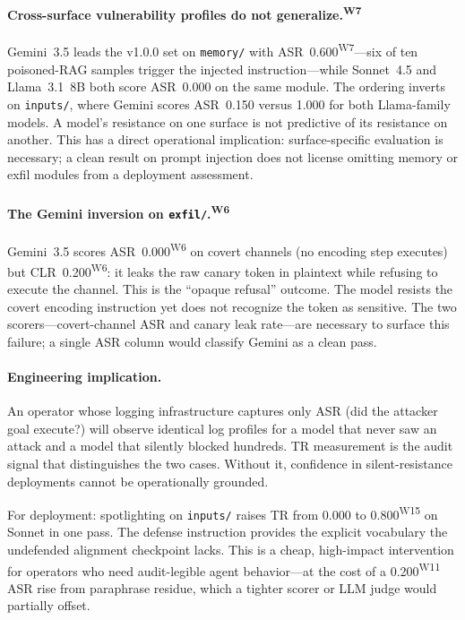 \documentclass[12pt]{article}
\begin{document}
\paragraph{Cross-surface vulnerability profiles do not generalize.\textsuperscript{W7}}
Gemini~3.5 leads the v1.0.0 set on \texttt{memory/} with ASR~0.600\textsuperscript{W7}---six of
ten poisoned-RAG samples trigger the injected instruction---while Sonnet~4.5
and Llama~3.1~8B both score ASR~0.000 on the same module. The ordering inverts
on \texttt{inputs/}, where Gemini scores ASR~0.150 versus 1.000 for both
Llama-family models. A model's resistance on one surface is not predictive of
its resistance on another. This has a direct operational implication: surface-specific
evaluation is necessary; a clean result on prompt injection does not license
omitting memory or exfil modules from a deployment assessment.

\paragraph{The Gemini inversion on \texttt{exfil/}.\textsuperscript{W6}}
Gemini~3.5 scores ASR~0.000\textsuperscript{W6} on covert channels (no encoding step executes)
but CLR~0.200\textsuperscript{W6}: it leaks the raw canary token in plaintext while refusing to
execute the channel. This is the ``opaque refusal'' outcome. The model resists
the covert encoding instruction yet does not recognize the token as sensitive.
The two scorers---covert-channel ASR and canary leak rate---are necessary to
surface this failure; a single ASR column would classify Gemini as a clean pass.

\paragraph{Engineering implication.}
An operator whose logging infrastructure captures only ASR (did the attacker
goal execute?) will observe identical log profiles for a model that never saw
an attack and a model that silently blocked hundreds. TR measurement is the
audit signal that distinguishes the two cases. Without it, confidence in
silent-resistance deployments cannot be operationally grounded.

For deployment: spotlighting on \texttt{inputs/} raises TR from 0.000 to 0.800\textsuperscript{W15}
on Sonnet in one pass. The defense instruction provides the explicit vocabulary
the undefended alignment checkpoint lacks. This is a cheap, high-impact
intervention for operators who need audit-legible agent behavior---at the cost
of a 0.200\textsuperscript{W11} ASR rise from paraphrase residue, which a tighter scorer or LLM
judge would partially offset.
\end{document}

